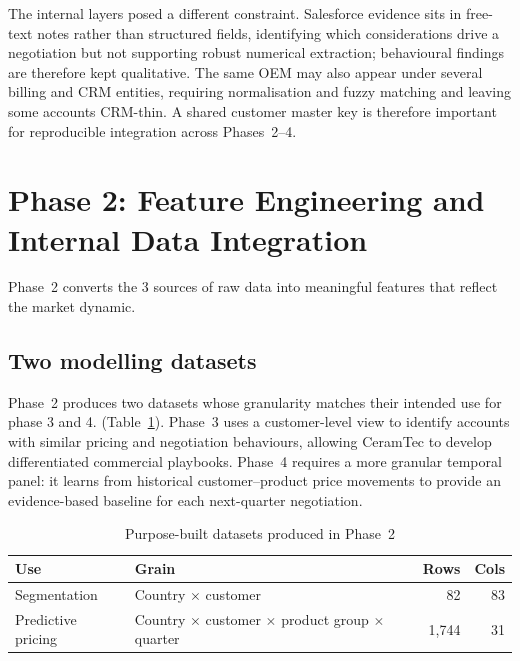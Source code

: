 \documentclass{article}
\begin{document}
The internal layers posed a different constraint. Salesforce evidence sits in free-text notes rather than structured fields, identifying which considerations drive a negotiation but not supporting robust numerical extraction; behavioural findings are therefore kept qualitative. The same OEM may also appear under several billing and CRM entities, requiring normalisation and fuzzy matching and leaving some accounts CRM-thin. A shared customer master key is therefore important for reproducible integration across Phases~2--4.



\clearpage

\section{Phase 2: Feature Engineering and Internal Data Integration}
\label{sec:phase2}

Phase~2 converts the 3 sources of raw data into meaningful features that reflect the market dynamic.

\subsection{Two modelling datasets}

Phase~2 produces two datasets whose granularity matches their intended use for phase 3 and 4. (Table~\ref{tab:phase2_datasets}). Phase~3 uses a customer-level view to identify accounts with similar pricing and negotiation behaviours, allowing CeramTec to develop differentiated commercial playbooks. Phase~4 requires a more granular temporal panel: it learns from historical customer--product price movements to provide an evidence-based baseline for each next-quarter negotiation.

\begin{table}[H]
\centering
\small
\begin{tabular}{@{}llrr@{}}
\toprule
\textbf{Use} & \textbf{Grain} & \textbf{Rows} & \textbf{Cols} \\
\midrule
Segmentation & Country $\times$ customer & 82 & 83 \\
Predictive pricing & Country $\times$ customer $\times$ product group $\times$ quarter & 1{,}744 & 31 \\
\bottomrule
\end{tabular}
\caption{Purpose-built datasets produced in Phase~2}
\label{tab:phase2_datasets}
\end{table}
\end{document}
